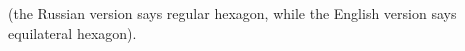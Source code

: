 \cite[page~12; page~6 in the Russian version]{kanevsky1980intellectualgenocide} (the Russian version says regular hexagon, while the English version says equilateral hexagon).
